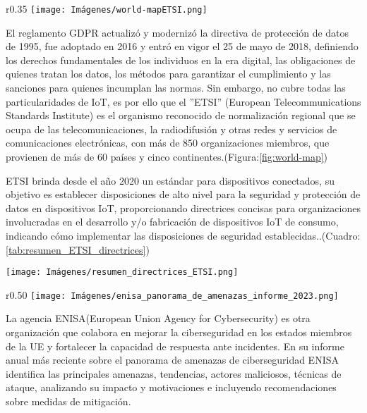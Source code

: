 \begin{wrapfigure}{r}{0.35\textwidth} %
    \centering
    \texttt{[image: Imágenes/world-mapETSI.png]}
      \caption{Mapa ETSI}
    \label{fig:world-map}
\end{wrapfigure}

El reglamento GDPR actualizó y modernizó la directiva de protección de datos de 1995, fue adoptado en 2016 y entró en vigor el 25 de mayo de 2018, definiendo los derechos fundamentales de los individuos en la era digital, las obligaciones de quienes tratan los datos, los métodos para garantizar el cumplimiento y las sanciones para quienes incumplan las normas. Sin embargo, no cubre todas las particularidades de IoT, es por ello que el ''ETSI'' (European Telecommunications Standards Institute) es el organismo reconocido de normalización regional que se ocupa de las telecomunicaciones, la radiodifusión y otras redes y servicios de comunicaciones electrónicas, con más de 850 organizaciones miembros, que provienen de más de 60 países y cinco continentes.(Figura:\ref{fig:world-map})


ETSI brinda desde el año 2020 un estándar para dispositivos conectados, su objetivo es establecer disposiciones de alto nivel para la seguridad y protección de datos en dispositivos IoT, proporcionando directrices concisas para organizaciones involucradas en el desarrollo y/o fabricación de dispositivos IoT de consumo, indicando cómo implementar las disposiciones de seguridad establecidas.\cite{ETSI_EN303645_2020}.(Cuadro: \ref{tab:resumen_ETSI_directrices})

\begin{table}[ht]
    \centering
        \texttt{[image: Imágenes/resumen\_directrices\_ETSI.png]} 
    \caption{Directrices de requerimientos básicos definidos por ETSI 2020}
    \label{tab:resumen_ETSI_directrices}
\end{table}

\begin{wrapfigure}{r}{0.50\textwidth} %
   \centering
    \texttt{[image: Imágenes/enisa\_panorama\_de\_amenazas\_informe\_2023.png]}
    \caption{Informe anual ENISA 2023}
    \label{fig:informe-Panorama-de-amenazas-ENISA}
\end{wrapfigure}

La agencia ENISA(European Union Agency for Cybersecurity) es otra organización que colabora en mejorar la ciberseguridad en los estados miembros de la UE y fortalecer la capacidad de respuesta ante incidentes. En su informe anual más reciente sobre el panorama de amenazas de ciberseguridad ENISA identifica las principales amenazas, tendencias, actores maliciosos, técnicas de ataque, analizando su impacto y motivaciones e incluyendo recomendaciones sobre medidas de mitigación.\cite{enisa2023}


